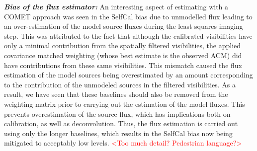 \documentclass{aa}
\begin{document}
\textbf{\emph{Bias of the flux estimator:}}\emph{ }An interesting
aspect of estimating with a COMET approach was seen in the SelfCal
bias due to unmodelled flux leading to an over-estimation of the model
source fluxes during the least squares imaging step. This was attributed
to the fact that although the calibrated visibilities have only a
minimal contribution from the spatially filtered visibilities, the
applied covariance matched weighting (whose best estimate is the observed
ACM) did have contributions from these same visibilities. This mismatch
caused the flux estimation of the model sources being overestimated
by an amount corresponding to the contribution of the unmodeled sources
in the filtered visibilities. As a result, we have seen that these
baselines should also be removed from the weighting matrix prior to
carrying out the estimation of the model fluxes. This prevents overestimation
of the source flux, which has implications both on calibration, as
well as deconvolution. Thus, the flux estimation is carried out using
only the longer baselines, which results in the SelfCal bias now being
mitigated to acceptably low levels. \textcolor{red}{<Too much detail?
Pedestrian language?>}
\end{document}
